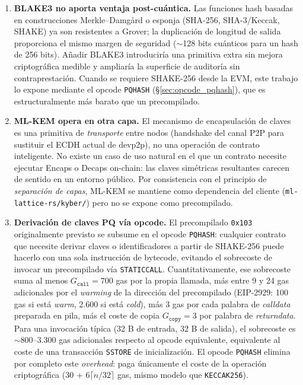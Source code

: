 \begin{enumerate}
  \item \textbf{BLAKE3 no aporta ventaja post-cuántica.} Las funciones hash basadas en construcciones Merkle--Damgård o esponja (SHA-256, SHA-3/Keccak, SHAKE) ya son resistentes a Grover; la duplicación de longitud de salida proporciona el mismo margen de seguridad ($\sim$128 bits cuánticos para un hash de 256 bits). Añadir BLAKE3 introduciría una primitiva extra sin mejora criptográfica medible y ampliaría la superficie de auditoría sin contraprestación. Cuando se requiere SHAKE-256 desde la EVM, este trabajo lo expone mediante el opcode \texttt{PQHASH} (\S\ref{sec:opcode_pqhash}), que es estructuralmente más barato que un precompilado.

  \item \textbf{ML-KEM opera en otra capa.} El mecanismo de encapsulación de claves es una primitiva de \emph{transporte} entre nodos (handshake del canal P2P para sustituir el ECDH actual de devp2p), no una operación de contrato inteligente. No existe un caso de uso natural en el que un contrato necesite ejecutar \textsf{Encaps} o \textsf{Decaps} on-chain: las claves simétricas resultantes carecen de sentido en un entorno público. Por consistencia con el principio de \emph{separación de capas}, ML-KEM se mantiene como dependencia del cliente (\texttt{ml-lattice-rs/kyber/}) pero no se expone como precompilado.

  \item \textbf{Derivación de claves PQ vía opcode.} El precompilado \texttt{0x103} originalmente previsto se subsume en el opcode \texttt{PQHASH}: cualquier contrato que necesite derivar claves o identificadores a partir de SHAKE-256 puede hacerlo con una sola instrucción de bytecode, evitando el sobrecoste de invocar un precompilado vía \texttt{STATICCALL}. Cuantitativamente, ese sobrecoste suma al menos $G_{\texttt{call}} = 700$ gas por la propia llamada, más entre 9 y 24 gas adicionales por el \emph{warming} de la dirección del precompilado (EIP-2929: 100 gas si está \emph{warm}, 2.600 si está \emph{cold}), más 3 gas por cada palabra de \emph{calldata} preparada en pila, más el coste de copia $G_{\texttt{copy}} = 3$ por palabra de \emph{returndata}. Para una invocación típica (32 B de entrada, 32 B de salida), el sobrecoste es $\sim 800\text{--}3.300$ gas adicionales respecto al opcode equivalente, equivalente al coste de una transacción \texttt{SSTORE} de inicialización. El opcode \texttt{PQHASH} elimina por completo este \emph{overhead}: paga únicamente el coste de la operación criptográfica (30 + $6 \lceil n/32 \rceil$ gas, mismo modelo que \texttt{KECCAK256}).


\end{enumerate}
